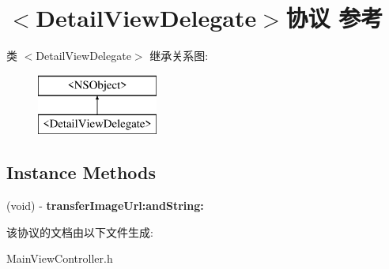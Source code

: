 \hypertarget{protocol_detail_view_delegate-p}{\section{$<$Detail\-View\-Delegate$>$协议 参考}
\label{protocol_detail_view_delegate-p}
}
类 $<$Detail\-View\-Delegate$>$ 继承关系图\-:\begin{figure}[H]
\begin{center}
\leavevmode
\includegraphics[height=2.000000cm]{protocol_detail_view_delegate-p}
\end{center}
\end{figure}
\subsection*{Instance Methods}
\begin{DoxyCompactItemize}
\item 
\hypertarget{protocol_detail_view_delegate-p_a86e4a02156a54b46ed8ba8c89306679b}{(void) -\/ {\bfseries transfer\-Image\-Url\-:and\-String\-:}}\label{protocol_detail_view_delegate-p_a86e4a02156a54b46ed8ba8c89306679b}

\end{DoxyCompactItemize}


该协议的文档由以下文件生成\-:\begin{DoxyCompactItemize}
\item 
Main\-View\-Controller.\-h\end{DoxyCompactItemize}
